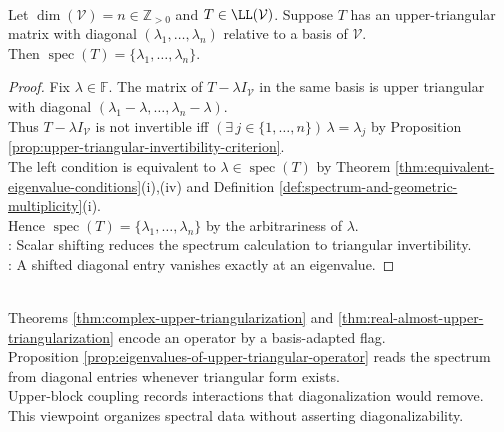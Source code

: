 \begin{proposition} \label{prop:eigenvalues-of-upper-triangular-operator} \\
Let $\dim(\mathcal{V})=n\in\mathbb{Z}_{>0}$ and $T\in\LL(\mathcal{V})$. Suppose $T$ has an upper-triangular matrix with diagonal $(\lambda_1,\ldots,\lambda_n)$ relative to a basis of $\mathcal{V}$.\\
Then $\operatorname{spec}(T)=\{\lambda_1,\ldots,\lambda_n\}$.
\begin{proof}
Fix $\lambda\in\mathbb{F}$. The matrix of $T-\lambda I_{\mathcal{V}}$ in the same basis is upper triangular with diagonal $(\lambda_1-\lambda,\ldots,\lambda_n-\lambda)$.\\
Thus $T-\lambda I_{\mathcal{V}}$ is not invertible iff $(\exists\,j\in\{1,\ldots,n\})\,\lambda=\lambda_j$ by Proposition \ref{prop:upper-triangular-invertibility-criterion}.\\
The left condition is equivalent to $\lambda\in\operatorname{spec}(T)$ by Theorem \ref{thm:equivalent-eigenvalue-conditions}(i),(iv) and Definition \ref{def:spectrum-and-geometric-multiplicity}(i).\\
Hence $\operatorname{spec}(T)=\{\lambda_1,\ldots,\lambda_n\}$ by the arbitrariness of $\lambda$.\\
: Scalar shifting reduces the spectrum calculation to triangular invertibility.\\
: A shifted diagonal entry vanishes exactly at an eigenvalue.
\end{proof}
\end{proposition}

\begin{perspective} \label{per:upper-triangular-viewpoint} \\
Theorems \ref{thm:complex-upper-triangularization} and \ref{thm:real-almost-upper-triangularization} encode an operator by a basis-adapted flag.\\
Proposition \ref{prop:eigenvalues-of-upper-triangular-operator} reads the spectrum from diagonal entries whenever triangular form exists.\\
Upper-block coupling records interactions that diagonalization would remove.\\
This viewpoint organizes spectral data without asserting diagonalizability.
\end{perspective}
